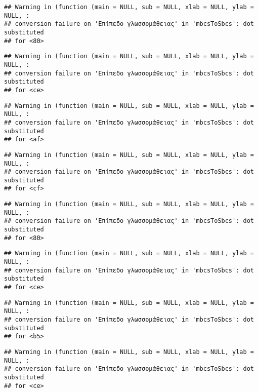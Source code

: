 \documentclass[
]{article}
\begin{document}
\begin{verbatim}
## Warning in (function (main = NULL, sub = NULL, xlab = NULL, ylab = NULL, :
## conversion failure on 'Επίπεδο γλωσσομάθειας' in 'mbcsToSbcs': dot substituted
## for <80>
\end{verbatim}

\begin{verbatim}
## Warning in (function (main = NULL, sub = NULL, xlab = NULL, ylab = NULL, :
## conversion failure on 'Επίπεδο γλωσσομάθειας' in 'mbcsToSbcs': dot substituted
## for <ce>
\end{verbatim}

\begin{verbatim}
## Warning in (function (main = NULL, sub = NULL, xlab = NULL, ylab = NULL, :
## conversion failure on 'Επίπεδο γλωσσομάθειας' in 'mbcsToSbcs': dot substituted
## for <af>
\end{verbatim}

\begin{verbatim}
## Warning in (function (main = NULL, sub = NULL, xlab = NULL, ylab = NULL, :
## conversion failure on 'Επίπεδο γλωσσομάθειας' in 'mbcsToSbcs': dot substituted
## for <cf>
\end{verbatim}

\begin{verbatim}
## Warning in (function (main = NULL, sub = NULL, xlab = NULL, ylab = NULL, :
## conversion failure on 'Επίπεδο γλωσσομάθειας' in 'mbcsToSbcs': dot substituted
## for <80>
\end{verbatim}

\begin{verbatim}
## Warning in (function (main = NULL, sub = NULL, xlab = NULL, ylab = NULL, :
## conversion failure on 'Επίπεδο γλωσσομάθειας' in 'mbcsToSbcs': dot substituted
## for <ce>
\end{verbatim}

\begin{verbatim}
## Warning in (function (main = NULL, sub = NULL, xlab = NULL, ylab = NULL, :
## conversion failure on 'Επίπεδο γλωσσομάθειας' in 'mbcsToSbcs': dot substituted
## for <b5>
\end{verbatim}

\begin{verbatim}
## Warning in (function (main = NULL, sub = NULL, xlab = NULL, ylab = NULL, :
## conversion failure on 'Επίπεδο γλωσσομάθειας' in 'mbcsToSbcs': dot substituted
## for <ce>
\end{verbatim}
\end{document}

